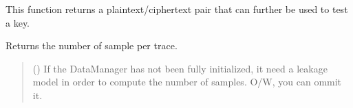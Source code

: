 \documentclass[letterpaper,10pt,english]{sphinxmanual}
\begin{document}
\begin{fulllineitems}
\begin{fulllineitems}
\label{\detokenize{MLSCAlib.Data:MLSCAlib.Data.data_manager.DataManager.get_check_data}}
\pysigstartsignatures
{}
\pysigstopsignatures
\sphinxAtStartPar
This function returns a plaintext/ciphertext pair that can further be used to test a key.

\end{fulllineitems}


\begin{fulllineitems}
\label{\detokenize{MLSCAlib.Data:MLSCAlib.Data.data_manager.DataManager.get_ns}}
\pysigstartsignatures
{}
\pysigstopsignatures
\sphinxAtStartPar
Returns the number of sample per trace.
\begin{quote}\begin{description}
\sphinxAtStartPar
{} ({\hyperref[\detokenize{MLSCAlib.Ciphers:MLSCAlib.Ciphers.leakage_model.LeakageModel}]{}}\sphinxstyleliteralemphasis{\sphinxupquote{, }}) \textendash{} If the DataManager has not been fully initialized, it need a
leakage model in order to compute the number of samples. O/W,
you can ommit it.

\end{description}\end{quote}

\end{fulllineitems}



\end{fulllineitems}
\end{document}

